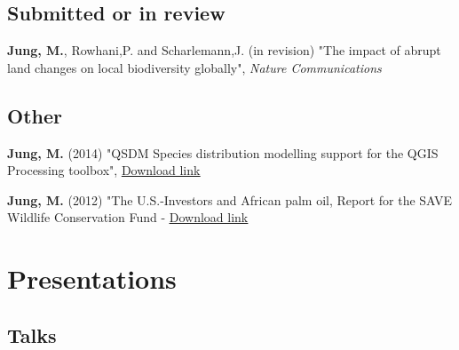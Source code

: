 \documentclass[12pt,a4paper,serif]{moderncv}        %
\begin{document}
\vspace{8pt}

\subsection{Submitted or in review}
\vspace{2pt}
\begin{bibenum}

 \item[] \textbf{Jung, M.}, Rowhani,P. and Scharlemann,J. (in revision) "The impact of abrupt land changes on local biodiversity globally", \emph{Nature Communications}

\end{bibenum}

\vspace{8pt}
\subsection{Other}
\vspace{2pt}
\begin{bibenum}

  \item[] \textbf{Jung, M.} (2014) "QSDM Species distribution modelling support for the QGIS Processing toolbox", \href{http://plugins.qgis.org/plugins/QSDM/}{\underline{Download link}}
  
  \item[] \textbf{Jung, M.} (2012) "The U.S.-Investors and African palm oil, Report for the SAVE Wildlife Conservation Fund - \href{https://save-wildlife.org/fileadmin/documents/Regenwaldschutz/Kamerun/us_investors_and_african_palm_oil.pdf}{\underline{Download link}}

\end{bibenum}


\section{Presentations}

\subsection{Talks}
\vspace{6pt}
\end{document}
